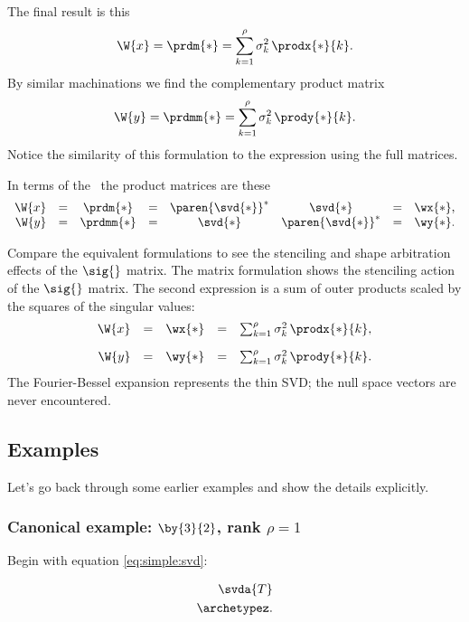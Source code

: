 The final result is this
\begin{equation}
  \W{x} = \prdm{*} = \sum_{k=1}^{\rho}{\sigma_{k}^{2}\,\prodx{*}{k}}.
\end{equation}
By similar machinations we find the complementary product matrix
\begin{equation}
  \W{y} = \prdmm{*} = \sum_{k=1}^{\rho}{\sigma_{k}^{2}\,\prody{*}{k}}.
\end{equation}
Notice the similarity of this formulation to the expression using the full matrices.

In terms of the \svdl \ the product matrices are these
\begin{equation}
  \begin{array}{rccccccl}
    \W{x} &=& \prdm{*}  &=& \paren{\svd{*}}^{*}&\svd{*} &=& \wx{*},\\
    \W{y} &=& \prdmm{*} &=& \svd{*}&\paren{\svd{*}}^{*} &=& \wy{*}.
  \end{array}
\end{equation}

Compare the equivalent formulations to see the stenciling and shape arbitration effects of the $\sig{}$ matrix. The matrix formulation shows the stenciling action of the $\sig{}$ matrix. The second expression is a sum of outer products scaled by the squares of the singular values:
\begin{equation}
  \begin{array}{rcccc}
    \W{x} &=& \wx{*} &=& \sum_{k=1}^{\rho}{\sigma_{k}^{2}\,\prodx{*}{k}},\\[10pt]
    \W{y} &=& \wy{*} &=& \sum_{k=1}^{\rho}{\sigma_{k}^{2}\,\prody{*}{k}}.
  \end{array}
\end{equation}
The Fourier-Bessel expansion represents the thin SVD; the null space vectors are never encountered.

\subsection{Examples}
Let's go back through some earlier examples and show the details explicitly. 

\subsubsection{Canonical example: $\by{3}{2}$, rank $\rho=1$}
Begin with equation \eqref{eq:simple:svd}:

\begin{equation*}
\begin{split}
    \svda{T}\\
    \archetypez.
\end{split}
\end{equation*}

